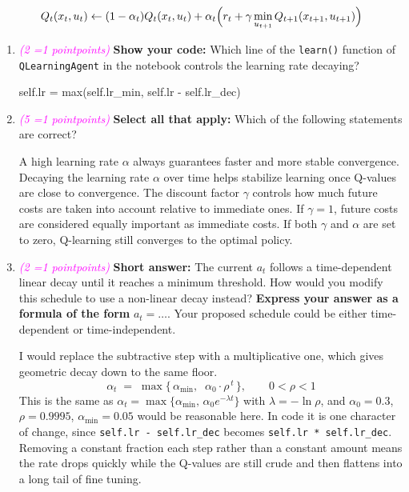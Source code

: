 \documentclass[11pt, letter, answers]{exam}
\newcommand{\grade}[1]{
    \small\textcolor{magenta}{\emph{(#1 \ifnum#1=1 point\else points\fi)}}%
    \normalsize
}
\newcommand{\sAll}{\textbf{Select all that apply: }}
\newcommand{\saq}{\textbf{Short answer: }}
\newcommand{\sCode}{\textbf{Show your code: }}
\begin{document}
\begin{equation}
    Q_t(x_t, u_t) \leftarrow (1-\alpha_t) Q_t(x_t,u_t) + \alpha_t \Bigl( r_t + \gamma \min_{u_{t+1}} Q_{t+1}(x_{t+1}, u_{t+1}) \Bigr) \label{eq:td}
\end{equation}

\begin{enumerate}[label=(\alph*), resume]

\item \grade{2} \sCode Which line of the \texttt{learn()} function of \texttt{QLearningAgent} in the notebook controls the learning rate decaying?
\begin{codeBox}[height=1.5in]
self.lr = max(self.lr_min, self.lr - self.lr_dec)
\end{codeBox}


\item \grade{5} \sAll Which of the following statements are correct?
{
\checkboxchar{$\Box$} \checkedchar{$\blacksquare$}  %
\begin{checkboxes}
    \choice A high learning rate $\alpha$ always guarantees faster and more stable convergence.
    \CorrectChoice Decaying the learning rate $\alpha$ over time helps stabilize learning once Q-values are close to convergence.
    \CorrectChoice The discount factor $\gamma$ controls how much future costs are taken into account relative to immediate ones.
    \CorrectChoice If $\gamma=1$, future costs are considered equally important as immediate costs.
    \choice If both $\gamma$ and $\alpha$ are set to zero, Q-learning still converges to the optimal policy.
\end{checkboxes}
}


\item \grade{2} \saq The current $a_t$ follows a time-dependent linear decay until it reaches a minimum threshold. How would you modify this schedule to use a non-linear decay instead? \textbf{Express your answer as a formula of the form} $a_t = \dots$. Your proposed schedule could be either time-dependent or time-independent.
\begin{answerBox}[height=3in]
I would replace the subtractive step with a multiplicative one, which gives geometric decay down to the same floor.
\[ \alpha_t \;=\; \max\bigl\{\, \alpha_{\min},\;\; \alpha_0 \cdot \rho^{\,t} \,\bigr\}, \qquad 0 < \rho < 1 \]
This is the same as $\alpha_t = \max\{\alpha_{\min},\, \alpha_0 e^{-\lambda t}\}$ with $\lambda = -\ln \rho$, and $\alpha_0 = 0.3$, $\rho = 0.9995$, $\alpha_{\min} = 0.05$ would be reasonable here. In code it is one character of change, since \texttt{self.lr - self.lr\_dec} becomes \texttt{self.lr * self.lr\_dec}. Removing a constant fraction each step rather than a constant amount means the rate drops quickly while the Q-values are still crude and then flattens into a long tail of fine tuning.


\end{answerBox}
\end{enumerate}
\end{document}
